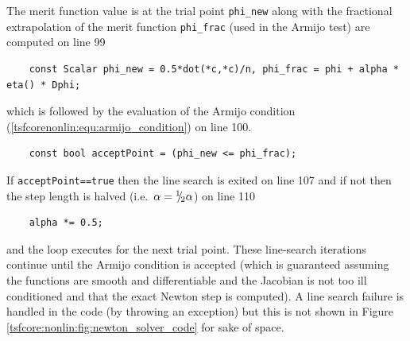 The merit function value is at the trial point \texttt{phi\_new} along
with the fractional extrapolation of the merit function
\texttt{phi\_frac} (used in the Armijo test) are computed on line 99
%
{\scriptsize\begin{verbatim}
    const Scalar phi_new = 0.5*dot(*c,*c)/n, phi_frac = phi + alpha * eta() * Dphi;
\end{verbatim}}
%
\noindent{}which is followed by the evaluation of the Armijo condition
(\ref{tsfcorenonlin:equ:armijo_condition}) on line 100.
%
{\scriptsize\begin{verbatim}
    const bool acceptPoint = (phi_new <= phi_frac);
\end{verbatim}}
%
If \texttt{acceptPoint==true} then the line search is exited on line 107 and if not
then the step length is halved (i.e.~$\alpha = {}^1 \!\! / \! {}_2 \alpha$) on line
110
%
{\scriptsize\begin{verbatim}
    alpha *= 0.5;
\end{verbatim}}
%
\noindent{}and the loop executes for the next trial point.  These
line-search iterations continue until the Armijo condition is accepted
(which is guaranteed assuming the functions are smooth and
differentiable and the Jacobian is not too ill conditioned and that
the exact Newton step is computed).  A line search failure is handled
in the code (by throwing an exception) but this is not shown in Figure
\ref{tsfcore:nonlin:fig:newton_solver_code} for sake of space.

